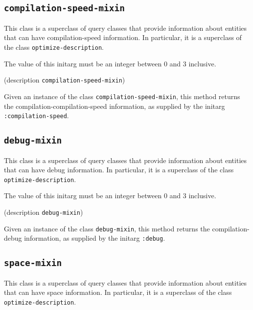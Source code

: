 \subsection{\texttt{compilation-speed-mixin}}
\label{sec-compilation-speed-mixin}

{\footnotesize
{}
}

This class is a superclass of query classes that provide information
about entities that can have compilation-speed information.  In particular, it is a
superclass of the class \texttt{optimize-description}.

{\footnotesize
{}
}

The value of this initarg must be an integer between $0$ and $3$
inclusive.

{\footnotesize
{} {(description {\tt compilation-speed-mixin})}
}

Given an instance of the class \texttt{compilation-speed-mixin}, this method
returns the compilation-compilation-speed information, as supplied by the initarg
\texttt{:compilation-speed}.

\subsection{\texttt{debug-mixin}}
\label{sec-debug-mixin}

{\footnotesize
{}
}
This class is a superclass of query classes that provide information
about entities that can have debug information.  In particular, it is a
superclass of the class \texttt{optimize-description}.

{\footnotesize
{}
}

The value of this initarg must be an integer between $0$ and $3$
inclusive.

{\footnotesize
{} {(description {\tt debug-mixin})}
}

Given an instance of the class \texttt{debug-mixin}, this method
returns the compilation-debug information, as supplied by the initarg
\texttt{:debug}.

\subsection{\texttt{space-mixin}}
\label{sec-space-mixin}

{\footnotesize
{}
}

This class is a superclass of query classes that provide information
about entities that can have space information.  In particular, it is a
superclass of the class \texttt{optimize-description}.

